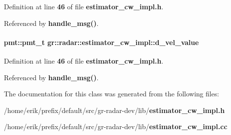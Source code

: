 Definition at line {\bf 46} of file {\bf estimator\+\_\+cw\+\_\+impl.\+h}.



Referenced by {\bf handle\+\_\+msg()}.

\paragraph[{d\+\_\+vel\+\_\+value}]{\setlength{\rightskip}{0pt plus 5cm}pmt\+::pmt\+\_\+t gr\+::radar\+::estimator\+\_\+cw\+\_\+impl\+::d\+\_\+vel\+\_\+value}\label{classgr_1_1radar_1_1estimator__cw__impl_a91edea7df7273a346cb78c381618e7e2}


Definition at line {\bf 46} of file {\bf estimator\+\_\+cw\+\_\+impl.\+h}.



Referenced by {\bf handle\+\_\+msg()}.



The documentation for this class was generated from the following files\+:\begin{DoxyCompactItemize}
\item 
/home/erik/prefix/default/src/gr-\/radar-\/dev/lib/{\bf estimator\+\_\+cw\+\_\+impl.\+h}\item 
/home/erik/prefix/default/src/gr-\/radar-\/dev/lib/{\bf estimator\+\_\+cw\+\_\+impl.\+cc}\end{DoxyCompactItemize}
